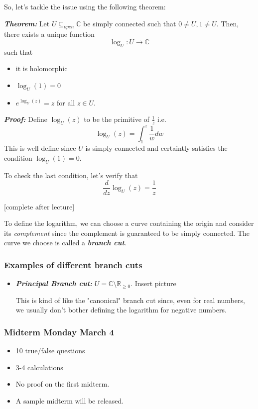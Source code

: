 \documentclass{article}
\newcommand{\R}{\mathbb{R}}
\newcommand{\C}{\mathbb{C}}
\begin{document}
\vskip 0.5cm
So, let's tackle the issue using the following theorem:

\vskip 0.5cm
\begin{dottedbox}
  \textbf{\emph{Theorem:}} Let $U \subseteq_{open} \C$ be simply connected such that $0 \neq U, 1 \neq U$. Then, there exists a unique function
  \[ \log_{U} : U \rightarrow \C \]
  such that 
  \begin{itemize}
    \item it is holomorphic
    \item $\log_U(1) = 0$
    \item $e^{\log_U(z)} = z$ for all $z \in U$.
  \end{itemize}
\end{dottedbox}

\vskip 0.5cm
\textbf{\emph{Proof:}} Define $\log_U(z)$ to be the primitive of $\frac{1}{z}$ i.e. 
\[ \log_U(z) = \int_{1}^{z} \frac{1}{w} dw \]
This is well define since $U$ is simply connected and certaintly satisfies the condition $\log_U(1) = 0$.

To check the last condition, let's verify that 
\[ \frac{d}{dz} \log_U(z) = \frac{1}{z} \]

[complete after lecture]

\vskip 0.5cm

\vskip 0.5cm
To define the logarithm, we can choose a curve containing the origin and consider its \emph{complement} since the complement is guaranteed to be simply connected. The curve we choose is called a \textbf{\emph{branch cut}}.

\vskip 0.5cm
\subsubsection*{Examples of different branch cuts}

\begin{itemize}
  \item \textbf{\emph{Principal Branch cut:}} $U = \C \setminus \R_{\geq 0}$. Insert picture
  
  \vskip 0.25cm
  This is kind of like the "canonical" branch cut since, even for real numbers, we usually don't bother defining the logarithm for negative numbers.
\end{itemize}

\vskip 0.5cm
\subsubsection*{Midterm Monday March 4}
\begin{itemize}
  \item 10 true/false questions
  \item 3-4 calculations
  \item No proof on the first midterm.
  \item A sample midterm will be released.
\end{itemize}
\end{document}
